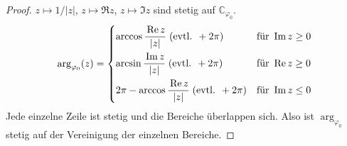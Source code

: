 \documentclass[a4paper,10pt]{scrbook}
\begin{document}
\begin{theorem}[Hilfssatz]
  \begin{proof}
    $z \mapsto 1/|z|$, $z \mapsto \Re z$, $z \mapsto \Im z$ sind stetig auf $\mathbb{C}_{\varphi_0}$.
    \begin{align*}
      \arg_{\varphi_0} (z) =
      \begin{dcases}
        \arccos \frac{\Re z}{|z|} \; (\text{evtl. } + 2 \pi) & \text{für } \Im z \geq 0 \\
        \arcsin \frac{\Im z}{|z|} \; (\text{evtl. } + 2 \pi) & \text{für } \Re z \geq 0 \\
        2 \pi - \arccos \frac{\Re z}{|z|} \; (\text{evtl. } + 2 \pi) & \text{für } \Im z \leq 0
      \end{dcases}
    \end{align*}
    Jede einzelne Zeile ist stetig und die Bereiche überlappen sich. Also ist $\arg_{\varphi_0}$ stetig auf der Vereinigung der einzelnen Bereiche.
  \end{proof}
\end{theorem}
\end{document}
